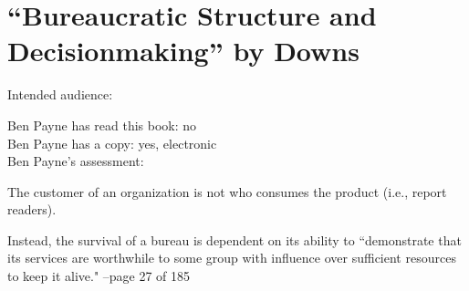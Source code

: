 \section{``Bureaucratic Structure and Decisionmaking'' by Downs}

\cite{1966_Downs}

Intended audience:

Ben Payne has read this book: no\\
Ben Payne has a copy: yes, electronic\\
Ben Payne's assessment:

The customer of an organization is not who consumes the product (i.e., report readers).

Instead, the survival of a bureau is dependent on its ability to ``demonstrate that its services are worthwhile to some group with influence over sufficient resources to keep it alive."
--page 27 of 185